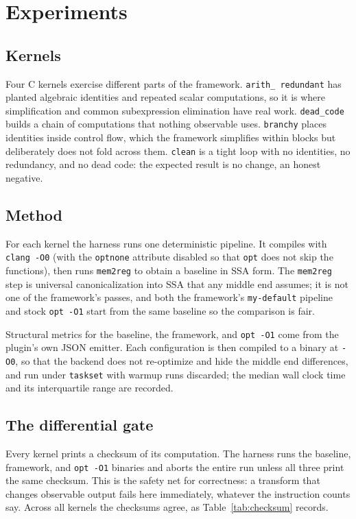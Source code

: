 \section{Experiments}

\subsection{Kernels}

Four C kernels exercise different parts of the framework. \texttt{arith\_%
redundant} has planted algebraic identities and repeated scalar computations,
so it is where simplification and common subexpression elimination have real
work. \texttt{dead\_code} builds a chain of computations that nothing observable
uses. \texttt{branchy} places identities inside control flow, which the framework
simplifies within blocks but deliberately does not fold across them.
\texttt{clean} is a tight loop with no identities, no redundancy, and no dead
code: the expected result is no change, an honest negative.

\subsection{Method}

For each kernel the harness runs one deterministic pipeline. It compiles with
\texttt{clang -O0} (with the \texttt{optnone} attribute disabled so that
\texttt{opt} does not skip the functions), then runs \texttt{mem2reg} to obtain a
baseline in SSA form. The \texttt{mem2reg} step is universal canonicalization
into SSA that any middle end assumes; it is not one of the framework's passes,
and both the framework's \texttt{my-default} pipeline and stock \texttt{opt -O1}
start from the same baseline so the comparison is fair.

Structural metrics for the baseline, the framework, and \texttt{opt -O1} come
from the plugin's own JSON emitter. Each configuration is then compiled to a
binary at \texttt{-O0}, so that the backend does not re-optimize and hide the
middle end differences, and run under \texttt{taskset} with warmup runs
discarded; the median wall clock time and its interquartile range are recorded.

\subsection{The differential gate}

Every kernel prints a checksum of its computation. The harness runs the baseline,
framework, and \texttt{opt -O1} binaries and aborts the entire run unless all
three print the same checksum. This is the safety net for correctness: a
transform that changes observable output fails here immediately, whatever the
instruction counts say. Across all \NumKernels{} kernels the checksums agree, as
Table~\ref{tab:checksum} records.
